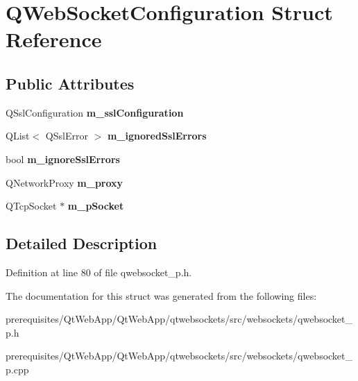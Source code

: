 \hypertarget{struct_q_web_socket_configuration}{}\section{Q\+Web\+Socket\+Configuration Struct Reference}
\label{struct_q_web_socket_configuration}
\subsection*{Public Attributes}
\begin{DoxyCompactItemize}
\item 
\mbox{\label{struct_q_web_socket_configuration_adb5f116446bc1af8949f65804bb3b873}} 
Q\+Ssl\+Configuration {\bfseries m\+\_\+ssl\+Configuration}
\item 
\mbox{\label{struct_q_web_socket_configuration_a67f0233a46862ca3dd0bec425c6c3aa4}} 
Q\+List$<$ Q\+Ssl\+Error $>$ {\bfseries m\+\_\+ignored\+Ssl\+Errors}
\item 
\mbox{\label{struct_q_web_socket_configuration_ada5309b7d24ec398347505220d21f1fc}} 
bool {\bfseries m\+\_\+ignore\+Ssl\+Errors}
\item 
\mbox{\label{struct_q_web_socket_configuration_a5b6ac99c2d15897a7c0041864e30b3c4}} 
Q\+Network\+Proxy {\bfseries m\+\_\+proxy}
\item 
\mbox{\label{struct_q_web_socket_configuration_a580619d9cd44883d9c01450cd536052c}} 
Q\+Tcp\+Socket $\ast$ {\bfseries m\+\_\+p\+Socket}
\end{DoxyCompactItemize}


\subsection{Detailed Description}


Definition at line 80 of file qwebsocket\+\_\+p.\+h.



The documentation for this struct was generated from the following files\+:\begin{DoxyCompactItemize}
\item 
prerequisites/\+Qt\+Web\+App/\+Qt\+Web\+App/qtwebsockets/src/websockets/qwebsocket\+\_\+p.\+h\item 
prerequisites/\+Qt\+Web\+App/\+Qt\+Web\+App/qtwebsockets/src/websockets/qwebsocket\+\_\+p.\+cpp\end{DoxyCompactItemize}
